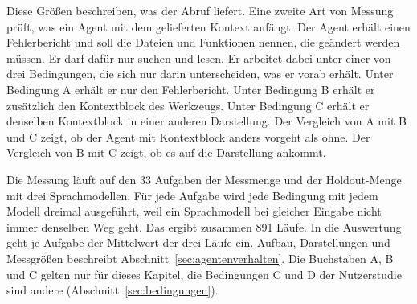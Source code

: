 Diese Größen beschreiben, was der Abruf liefert. Eine zweite Art von Messung prüft, was ein Agent mit dem gelieferten Kontext anfängt. Der Agent erhält einen Fehlerbericht und soll die Dateien und Funktionen nennen, die geändert werden müssen. Er darf dafür nur suchen und lesen. Er arbeitet dabei unter einer von drei Bedingungen, die sich nur darin unterscheiden, was er vorab erhält. Unter Bedingung A erhält er nur den Fehlerbericht. Unter Bedingung B erhält er zusätzlich den Kontextblock des Werkzeugs. Unter Bedingung C erhält er denselben Kontextblock in einer anderen Darstellung. Der Vergleich von A mit B und C zeigt, ob der Agent mit Kontextblock anders vorgeht als ohne. Der Vergleich von B mit C zeigt, ob es auf die Darstellung ankommt.

Die Messung läuft auf den 33 Aufgaben der Messmenge und der Holdout-Menge mit drei Sprachmodellen. Für jede Aufgabe wird jede Bedingung mit jedem Modell dreimal ausgeführt, weil ein Sprachmodell bei gleicher Eingabe nicht immer denselben Weg geht. Das ergibt zusammen 891 Läufe. In die Auswertung geht je Aufgabe der Mittelwert der drei Läufe ein. Aufbau, Darstellungen und Messgrößen beschreibt Abschnitt~\ref{sec:agentenverhalten}. Die Buchstaben A, B und C gelten nur für dieses Kapitel, die Bedingungen C und D der Nutzerstudie sind andere (Abschnitt~\ref{sec:bedingungen}).

